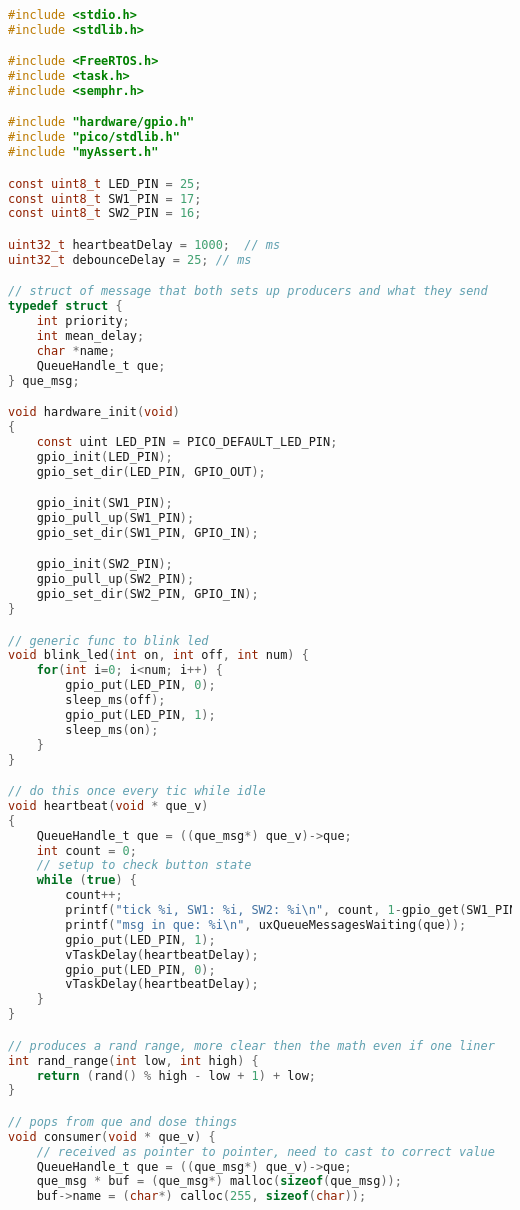 \documentclass[sigconf]{article}
\begin{document}
\begin{lstlisting}[basicstyle=\footnotesize\ttfamily, language=c,breaklines]

#include <stdio.h>
#include <stdlib.h>

#include <FreeRTOS.h>
#include <task.h>
#include <semphr.h>

#include "hardware/gpio.h"
#include "pico/stdlib.h"
#include "myAssert.h"

const uint8_t LED_PIN = 25;
const uint8_t SW1_PIN = 17;
const uint8_t SW2_PIN = 16;

uint32_t heartbeatDelay = 1000;  // ms
uint32_t debounceDelay = 25; // ms

// struct of message that both sets up producers and what they send
typedef struct {
    int priority;
    int mean_delay;
    char *name;
    QueueHandle_t que;
} que_msg;

void hardware_init(void)
{
    const uint LED_PIN = PICO_DEFAULT_LED_PIN;
    gpio_init(LED_PIN);
    gpio_set_dir(LED_PIN, GPIO_OUT);

    gpio_init(SW1_PIN);
    gpio_pull_up(SW1_PIN);
    gpio_set_dir(SW1_PIN, GPIO_IN);

    gpio_init(SW2_PIN);
    gpio_pull_up(SW2_PIN);
    gpio_set_dir(SW2_PIN, GPIO_IN);
}

// generic func to blink led
void blink_led(int on, int off, int num) {
    for(int i=0; i<num; i++) {
        gpio_put(LED_PIN, 0);
        sleep_ms(off);
        gpio_put(LED_PIN, 1);
        sleep_ms(on);
    }
}

// do this once every tic while idle
void heartbeat(void * que_v)
{   
    QueueHandle_t que = ((que_msg*) que_v)->que;
    int count = 0;
    // setup to check button state
    while (true) {
        count++;
        printf("tick %i, SW1: %i, SW2: %i\n", count, 1-gpio_get(SW1_PIN), 1-gpio_get(SW2_PIN));
        printf("msg in que: %i\n", uxQueueMessagesWaiting(que));
        gpio_put(LED_PIN, 1);
        vTaskDelay(heartbeatDelay);
        gpio_put(LED_PIN, 0);
        vTaskDelay(heartbeatDelay);
    }
}

// produces a rand range, more clear then the math even if one liner
int rand_range(int low, int high) {
    return (rand() % high - low + 1) + low;
}

// pops from que and dose things
void consumer(void * que_v) {
    // received as pointer to pointer, need to cast to correct value
    QueueHandle_t que = ((que_msg*) que_v)->que;
    que_msg * buf = (que_msg*) malloc(sizeof(que_msg));
    buf->name = (char*) calloc(255, sizeof(char));


\end{lstlisting}
\end{document}
